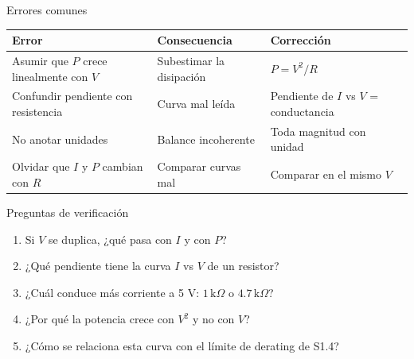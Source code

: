 \documentclass[aspectratio=169]{beamer}
\begin{document}
\begin{frame}{Errores comunes}
  \begin{table}
    \small
    \begin{tabular}{p{}p{}p{}}
      \toprule
      Error & Consecuencia & Corrección \\
      \midrule
      Asumir que $P$ crece linealmente con $V$ & Subestimar la disipación & $P = V^2/R$ \\
      Confundir pendiente con resistencia & Curva mal leída & Pendiente de $I$ vs $V$ = conductancia \\
      No anotar unidades & Balance incoherente & Toda magnitud con unidad \\
      Olvidar que $I$ y $P$ cambian con $R$ & Comparar curvas mal & Comparar en el mismo $V$ \\
      \bottomrule
    \end{tabular}
  \end{table}
\end{frame}

\begin{frame}{Preguntas de verificación}
  \begin{enumerate}
    \item Si $V$ se duplica, ¿qué pasa con $I$ y con $P$?
    \item ¿Qué pendiente tiene la curva $I$ vs $V$ de un resistor?
    \item ¿Cuál conduce más corriente a 5 V: $1\,\text{k}\Omega$ o $4.7\,\text{k}\Omega$?
    \item ¿Por qué la potencia crece con $V^2$ y no con $V$?
    \item ¿Cómo se relaciona esta curva con el límite de derating de S1.4?
  \end{enumerate}
\end{frame}
\end{document}
